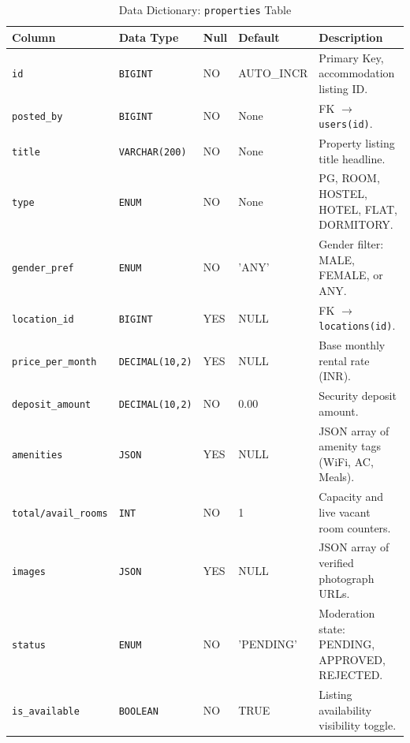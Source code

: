 \begin{table}[htbp]
\centering
\caption{Data Dictionary: \texttt{properties} Table}
\label{tab:dict_properties}
\footnotesize
\begin{tabularx}{\textwidth}{lp{2.5cm}lp{2.0cm}X}
\toprule
\textbf{Column} & \textbf{Data Type} & \textbf{Null} & \textbf{Default} & \textbf{Description} \\
\midrule
\texttt{id} & \texttt{BIGINT} & NO & AUTO\_INCR & Primary Key, accommodation listing ID. \\
\texttt{posted\_by} & \texttt{BIGINT} & NO & None & FK $\rightarrow$ \texttt{users(id)}. \\
\texttt{title} & \texttt{VARCHAR(200)} & NO & None & Property listing title headline. \\
\texttt{type} & \texttt{ENUM} & NO & None & PG, ROOM, HOSTEL, HOTEL, FLAT, DORMITORY. \\
\texttt{gender\_pref} & \texttt{ENUM} & NO & 'ANY' & Gender filter: MALE, FEMALE, or ANY. \\
\texttt{location\_id} & \texttt{BIGINT} & YES & NULL & FK $\rightarrow$ \texttt{locations(id)}. \\
\texttt{price\_per\_month} & \texttt{DECIMAL(10,2)}& YES & NULL & Base monthly rental rate (INR). \\
\texttt{deposit\_amount} & \texttt{DECIMAL(10,2)}& NO & 0.00 & Security deposit amount. \\
\texttt{amenities} & \texttt{JSON} & YES & NULL & JSON array of amenity tags (WiFi, AC, Meals). \\
\texttt{total/avail\_rooms}& \texttt{INT} & NO & 1 & Capacity and live vacant room counters. \\
\texttt{images} & \texttt{JSON} & YES & NULL & JSON array of verified photograph URLs. \\
\texttt{status} & \texttt{ENUM} & NO & 'PENDING' & Moderation state: PENDING, APPROVED, REJECTED. \\
\texttt{is\_available} & \texttt{BOOLEAN} & NO & TRUE & Listing availability visibility toggle. \\
\bottomrule
\end{tabularx}
\end{table}

